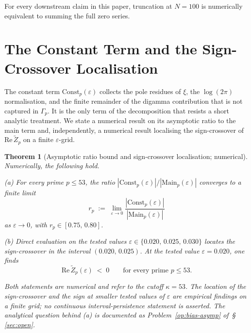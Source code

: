 \documentclass[11pt]{article}
\newtheorem{theorem}{Theorem}[section]
\newcommand{\Zt}{\widetilde{Z}}
\begin{document}
For every downstream claim in this paper, truncation at $N=100$ is
numerically equivalent to summing the full zero series.

\section{The Constant Term and the Sign-Crossover Localisation}
\label{sec:const}

The constant term $\mathrm{Const}_p(\varepsilon)$ collects the pole
residues of $\xi$, the $\log(2\pi)$ normalisation, and the finite
remainder of the digamma contribution that is not captured in
$\Gamma_p$.
It is the only term of the decomposition that resists a short analytic
treatment.
We state a numerical result on its asymptotic ratio to the main term
and, independently, a numerical result localising the sign-crossover
of $\mathrm{Re}\,\Zt_p$ on a finite $\varepsilon$-grid.

\begin{theorem}[Asymptotic ratio bound and sign-crossover localisation; numerical]
\label{thm:ratio-signcross}
Numerically, the following hold.

\emph{(a)} For every prime $p\le 53$, the ratio
$|\mathrm{Const}_p(\varepsilon)|/|\mathrm{Main}_p(\varepsilon)|$
converges to a finite limit
\[
r_p \;:=\; \lim_{\varepsilon\to 0}
\frac{|\mathrm{Const}_p(\varepsilon)|}{|\mathrm{Main}_p(\varepsilon)|}
\]
as $\varepsilon\to 0$, with $r_p\in[0.75,\,0.80]$.

\emph{(b)} Direct evaluation on the tested values
$\varepsilon\in\{0.020,\,0.025,\,0.030\}$ locates the sign-crossover
in the interval $(0.020,\,0.025)$.
At the tested value $\varepsilon=0.020$, one finds
\[
\mathrm{Re}\,\Zt_p(\varepsilon) \;<\; 0 \qquad
\text{for every prime } p\le 53.
\]

Both statements are numerical and refer to the cutoff $\kappa=53$.
The location of the sign-crossover and the sign at smaller tested
values of $\varepsilon$ are empirical findings on a finite grid; no
continuous interval-persistence statement is asserted.
The analytical question behind (a) is documented as
Problem~\ref{op:bias-asymp} of~\S\,\ref{sec:open}.
\end{theorem}
\end{document}
